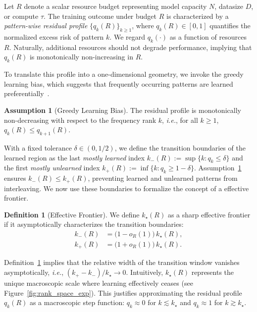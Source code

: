 \documentclass{article}
\theoremstyle{plain}
\theoremstyle{definition}
\newtheorem{definition}[theorem]{Definition}
\newtheorem{assumption}[theorem]{Assumption}
\theoremstyle{remark}
\begin{document}
Let $R$ denote a scalar resource budget representing model capacity $N$, datasize $D$, or compute $\tau$. The training outcome under budget $R$ is characterized by a \emph{pattern-wise residual profile} $\{q_k(R)\}_{k\ge 1}$, where $q_k(R)\in[0,1]$ quantifies the normalized excess risk of pattern $k$.
We regard $q_k(\cdot)$ as a function of resources $R$. Naturally, additional resources should not degrade performance, implying that $q_k(R)$ is monotonically non-increasing in $R$. 


To translate this profile into a one-dimensional geometry, we invoke the greedy learning bias, which suggests that frequently occurring patterns are learned preferentially~\citep{gong2025disentanglingfeaturestructuremathematically}.
\begin{assumption}[Greedy Learning Bias]
    \label{assump:rank_monotone}
    The residual profile is monotonically non-decreasing with respect to the frequency rank $k$, \textit{i.e.}, for all $k \geq 1$, $q_k(R) \le q_{k+1}(R).$
\end{assumption}


With a fixed tolerance $\delta \in (0, 1/2)$, we define the transition boundaries of the learned region as the last \textit{mostly learned} index $k_{-}(R) := \sup\{k: q_k \le \delta\}$ and the first \textit{mostly unlearned} index $k_{+}(R) := \inf\{k: q_k \ge 1-\delta\}$.
Assumption~\ref{assump:rank_monotone} ensures $k_{-}(R) \le k_{+}(R)$, preventing learned and unlearned patterns from interleaving.
We now use these boundaries to formalize the concept of a effective frontier.


\begin{definition}[Effective Frontier]\label{def:effective_frontier}
    We define $k_\star(R)$ as a sharp effective frontier if it asymptotically characterizes the transition boundaries:
    \begin{equation*}
        \label{eq:frontier_sharp}
        \begin{aligned}
        k_{-}(R) &= \bigl(1-o_R(1)\bigr)\,k_\star(R),\\
        k_{+}(R) &= \bigl(1+o_R(1)\bigr)\,k_\star(R).
        \end{aligned}
    \end{equation*}
\end{definition}


Definition~\ref{def:effective_frontier} implies that the relative width of the transition window vanishes asymptotically, \textit{i.e.}, $(k_+ - k_-)/k_\star \to 0$. 
Intuitively, $k_\star(R)$ represents the unique macroscopic scale where learning effectively ceases (see Figure~\ref{fig:rank_space_exp}). %
This justifies approximating the residual profile $q_k(R)$ as a macroscopic step function: $q_k \approx 0$ for $k \lesssim k_\star$ and $q_k \approx 1$ for $k \gtrsim k_\star$.
\end{document}
